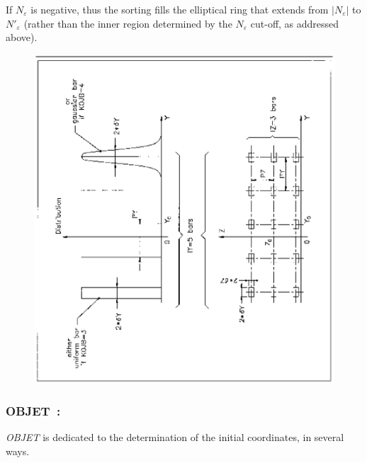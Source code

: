 \noindent If $N_\varepsilon$ is negative, thus the sorting fills the 
elliptical ring that extends from $\left| N_\varepsilon \right|$ to 
$N'_\varepsilon$ (rather than the inner region determined by the $N_\varepsilon$ 
cut-off, as addressed above).
\newpage
\vfill
 \begin{figure}[H]
\centerline{\includegraphics[width=15cm,angle=-90]{Fig5.ps}}  %
 \end{figure}
 \vfill 

\newpage

 
\subsubsection*{OBJET~:   \OBJETTitl} \label{OBJET} 

\textsl{OBJET} is dedicated to the determination of the initial
coordinates, in several ways.  
\medskip

